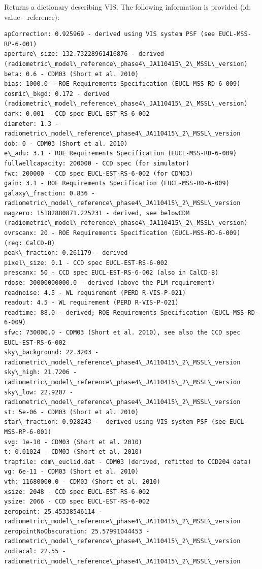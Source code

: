 \documentclass[a4paper,11pt,english]{sphinxmanual}
\begin{document}
\begin{fulllineitems}
\label{instrument:support.VISinstrumentModel.VISinformation}
Returns a dictionary describing VIS. The following information is provided (id: value - reference):

\begin{Verbatim}[commandchars=\\\{\}]
apCorrection: 0.925969 - derived using VIS system PSF (see EUCL-MSS-RP-6-001)
aperture\_size: 132.73228961416876 - derived (radiometric\_model\_reference\_phase4\_JA110415\_2\_MSSL\_version)
beta: 0.6 - CDM03 (Short et al. 2010)
bias: 1000.0 - ROE Requirements Specification (EUCL-MSS-RD-6-009)
cosmic\_bkgd: 0.172 - derived  (radiometric\_model\_reference\_phase4\_JA110415\_2\_MSSL\_version)
dark: 0.001 - CCD spec EUCL-EST-RS-6-002
diameter: 1.3 - radiometric\_model\_reference\_phase4\_JA110415\_2\_MSSL\_version
dob: 0 - CDM03 (Short et al. 2010)
e\_adu: 3.1 - ROE Requirements Specification (EUCL-MSS-RD-6-009)
fullwellcapacity: 200000 - CCD spec (for simulator)
fwc: 200000 - CCD spec EUCL-EST-RS-6-002 (for CDM03)
gain: 3.1 - ROE Requirements Specification (EUCL-MSS-RD-6-009)
galaxy\_fraction: 0.836 - radiometric\_model\_reference\_phase4\_JA110415\_2\_MSSL\_version
magzero: 15182880871.225231 - derived, see belowCDM (radiometric\_model\_reference\_phase4\_JA110415\_2\_MSSL\_version)
ovrscanx: 20 - ROE Requirements Specification (EUCL-MSS-RD-6-009) (req: CalCD-B)
peak\_fraction: 0.261179 - derived
pixel\_size: 0.1 - CCD spec EUCL-EST-RS-6-002
prescanx: 50 - CCD spec EUCL-EST-RS-6-002 (also in CalCD-B)
rdose: 30000000000.0 - derived (above the PLM requirement)
readnoise: 4.5 - WL requirement (PERD R-VIS-P-021)
readout: 4.5 - WL requirement (PERD R-VIS-P-021)
readtime: 88.0 - derived; ROE Requirements Specification (EUCL-MSS-RD-6-009)
sfwc: 730000.0 - CDM03 (Short et al. 2010), see also the CCD spec EUCL-EST-RS-6-002
sky\_background: 22.3203 - radiometric\_model\_reference\_phase4\_JA110415\_2\_MSSL\_version
sky\_high: 21.7206 - radiometric\_model\_reference\_phase4\_JA110415\_2\_MSSL\_version
sky\_low: 22.9207 - radiometric\_model\_reference\_phase4\_JA110415\_2\_MSSL\_version
st: 5e-06 - CDM03 (Short et al. 2010)
star\_fraction: 0.928243 -  derived using VIS system PSF (see EUCL-MSS-RP-6-001)
svg: 1e-10 - CDM03 (Short et al. 2010)
t: 0.01024 - CDM03 (Short et al. 2010)
trapfile: cdm\_euclid.dat - CDM03 (derived, refitted to CCD204 data)
vg: 6e-11 - CDM03 (Short et al. 2010)
vth: 11680000.0 - CDM03 (Short et al. 2010)
xsize: 2048 - CCD spec EUCL-EST-RS-6-002
ysize: 2066 - CCD spec EUCL-EST-RS-6-002
zeropoint: 25.45338546114 - radiometric\_model\_reference\_phase4\_JA110415\_2\_MSSL\_version
zeropointNoObscuration: 25.57991044453 - radiometric\_model\_reference\_phase4\_JA110415\_2\_MSSL\_version
zodiacal: 22.55 - radiometric\_model\_reference\_phase4\_JA110415\_2\_MSSL\_version
\end{Verbatim}


\end{fulllineitems}
\end{document}
